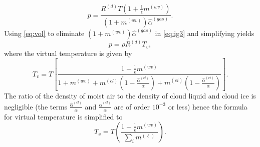 \documentclass{agujournal}
\begin{document}
\begin{equation}
p=\frac{R^{(d)} T\left( 1+\frac{1}{\epsilon}m^{(wv)}\right)}{\left(1+m^{(wv)}\right)\hat{\alpha}^{(gas)}}\label{eq:ig3}.
\end{equation}
Using \eqref{eq:vol} to eliminate $\left(1+m^{(wv)}\right)\hat{\alpha}^{(gas)}$ in \eqref{eq:ig3} and simplifying yields
\begin{equation}
p=\rho R^{(d)} T_v\label{eq:igl},
\end{equation}
where the virtual temperature is given by
\begin{equation}
T_v =T\left[ \frac{1+\frac{1}{\epsilon}m^{(wv)}}{1+m^{(wv)}+m^{(cl)}\left(1-\frac{\hat{\alpha}^{(cl)}}{\alpha}\right)+m^{(ci)}\left(1-\frac{\hat{\alpha}^{(ci)}}{\alpha}\right)}\right].
\end{equation}
The ratio of the density of moist air to the density of cloud liquid and cloud ice is negligible (the terms $\frac{\hat{\alpha}^{(cl)}}{\alpha}$ and $\frac{\hat{\alpha}^{(cl)}}{\alpha}$ are of order $10^{-3}$ or less) hence the formula for virtual temperature is simplified to
\begin{equation}
T_v =T\left( \frac{1+\frac{1}{\epsilon}m^{(wv)}}{\sum_{i}m^{(\ell)}}\right).\label{eq:tv}
\end{equation}
\end{document}
